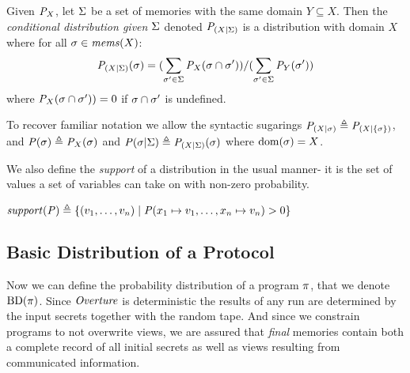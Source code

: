 \begin{definition}
  Given ${\mathit{P}}_{X}$, let $\Sigma$ be a set of memories with the
  same domain $Y \subseteq X$. Then the \emph{conditional distribution given
  $\Sigma$}  denoted
  $\mathit{P}_{({X}|{\Sigma})}$ is a distribution with domain $X$ where for all
  $\sigma \in \mathit{mems}(X)$:
  $$
  \mathit{P}_{({X}|{\Sigma})}(\sigma) =
  (\sum_{\sigma' \in \Sigma} {\mathit{P}}_{X}(\sigma \cap \sigma')) /
  (\sum_{\sigma' \in \Sigma} {\mathit{P}}_{Y}(\sigma'))
  $$
  where ${\mathit{P}}_{X}(\sigma \cap \sigma')) = 0$ if $\sigma \cap \sigma'$ is undefined.
\end{definition}
To recover familiar notation we allow the syntactic
sugarings $\mathit{P}_{({X}|{\sigma})}  \triangleq \mathit{P}_{({X}|{\{ \sigma\}})}$, and
$\mathit{P}(\sigma)  \triangleq {\mathit{P}}_{X}(\sigma)$ and $\mathit{P}(\sigma|\Sigma) \triangleq
\mathit{P}_{({X}|{\Sigma})}(\sigma)$ where $\mathrm{dom}(\sigma) = X$.

We also define the \emph{support} of a distribution in the usual manner-
it is the set of values a set of variables can take on with non-zero
probability.
\begin{definition}[Support]
  $\mathit{support}(\mathit{P}) \triangleq \{ (v_1,\ldots,v_n) \mid
  \mathit{P}(x_1 \mapsto v_1, \ldots, x_n \mapsto v_n) > 0 \} $
\end{definition}

\subsection{Basic Distribution of a Protocol}
Now we can define the probability distribution of a program $\pi$,
that we denote $\mathrm{BD}(\pi)$. Since $\mathit{Overture}$ is deterministic the
results of any run are determined by the input secrets together with
the random tape. And since we constrain programs to not overwrite
views, we are assured that \emph{final} memories contain both a
complete record of all initial secrets as well as views resulting from
communicated information. 

